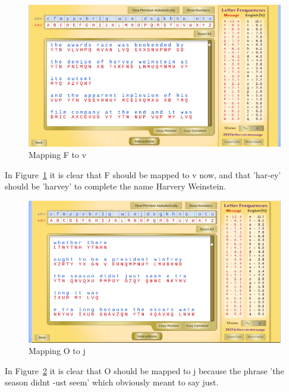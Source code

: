\documentclass[12pt]{article}
\begin{document}
\begin{figure}[H]
    \begin{center}
        \includegraphics[scale=0.48]{c16.png}
    \end{center}{}
    \caption{Mapping F to v}
    \label{fig:c16}
\end{figure}

In Figure~\ref{fig:c16} it is clear that F should be mapped to v now, and that 'har-ey' should be 'harvey' to complete the name Harvery Weinstein.


\begin{figure}[H]
    \begin{center}
        \includegraphics[scale=0.48]{c17.png}
    \end{center}{}
    \caption{Mapping O to j}
    \label{fig:c17}
\end{figure}

In Figure~\ref{fig:c17} it is clear that O should be mapped to j because the phrase 'the season didnt -ust seem' which obviously meant to say just.
\end{document}
